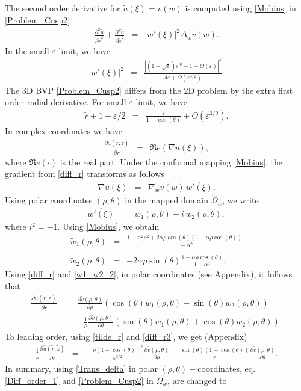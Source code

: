 \documentclass[12pt]{article}
\newcommand{\beq}{\begin{eqnarray}}
\newcommand{\eeq}{\end{eqnarray}}
\newcommand{\p}{\partial}
\newcommand{\eps}{\varepsilon}
\begin{document}
%
The second order derivative for $\tilde{u}(\xi) = v(w)$ is computed using \eqref{Mobius} in \eqref{Problem_Cusp2} \cite{Henricci}
\beq\label{Trans_delta}
\frac{\p^2 \tilde  u}{\p \tilde r^2}+\frac{\p^2  \tilde u}{\p \tilde z^2}&=& |w'(\xi)|^2 \Delta_w  v(w).
\eeq
In the small $\eps$ limit, we have
\beq
|w'(\xi)|^2&=&\frac{|(1-\sqrt{\eps})e^{i\theta}-1+O(\eps)|^4}{4\eps +O(\eps^{3/2})}.
\eeq
The 3D BVP \eqref{Problem_Cusp2} differs from the 2D problem \cite{NonLin2017} by the extra first order radial derivative. For small $\eps$ limit, we have
\beq\label{tilde_r}
\tilde r +1+ \eps/2&=& \frac{\eps}{1-\cos(\theta)} +O(\eps^{3/2}) .
\eeq
In complex coordinates we have
\beq\label{diff_r}
\frac{\p u( \tilde r, \tilde z)}{\p \tilde r} &=& \Re e \left(  \nabla u( \xi)\right),
\eeq
where $\Re e(\cdot)$ is the real part. Under the conformal mapping \eqref{Mobius}, the gradient from \eqref{diff_r} transforms as follows \cite{Henricci}
\beq\label{grad_trans}
\nabla u(\xi) &=& \nabla_w v(w) \, \overline{w'(\xi)}.
\eeq
Using polar coordinates $(\rho,\theta)$ in the mapped domain $\Omega_w$, we write
\beq\label{w1_w2}
\overline{w'(\xi)}&=&w_1(\rho,\theta)+i\,w_2(\rho,\theta),
\eeq
where $i^2=-1$.
Using \eqref{Mobius}, we obtain
\beq\label{w1_w2_2}
\tilde w_1(\rho,\theta)&=& \frac{1-\alpha^2 \rho^2 +2\alpha \rho \cos(\theta)(1+ \alpha  \rho   \cos(\theta)) }{1-\alpha^2}\\
\nonumber  \\
\tilde w_2(\rho,\theta)&=& -2\alpha \rho\sin(\theta)\frac{ 1 + \alpha  \rho   \cos(\theta) }{1-\alpha^2}. \nonumber
\eeq
Using \eqref{diff_r} and \eqref{w1_w2_2}, in polar coordinates (see Appendix), it follows that
\beq\label{diff_r3}
\frac{\p \tilde u(\tilde r, \tilde z)}{\p \tilde r} &=& \frac{\p  \tilde v(\rho,\theta)}{\p \rho }\left( \cos(\theta) \tilde w_1(\rho,\theta)  - \sin(\theta)\tilde w_2(\rho,\theta)  \right) \\
&&-\frac{1}{\rho}\frac{\p  \tilde v(\rho,\theta) }{\p \theta }\left( \sin(\theta)\tilde w_1(\rho,\theta) +\cos(\theta) \tilde w_2(\rho,\theta) \right). \nonumber
\eeq
To leading order, using \eqref{tilde_r} and \eqref{diff_r3}, we get (Appendix)
\beq\label{Diff_order_1}
\frac{1}{\tilde r}\frac{\p \tilde u(\tilde r,\tilde z)}{\p \tilde r}&=&
 -  \frac{ \rho(1-\cos(\theta))^2}{\eps^{3/2}}\frac{\p\tilde v (\rho,\theta )}{\p\rho}
- \frac{\sin(\theta)(1-\cos(\theta))}{\eps}\frac{\p\tilde v (\rho,\theta  )}{\p\theta}. %
\eeq
In summary, using  \eqref{Trans_delta} in polar $(\rho,\theta)-$coordinates,  eq. \eqref{Diff_order_1} and \eqref{Problem_Cusp2} in $\Omega_w$, are changed to
\end{document}

